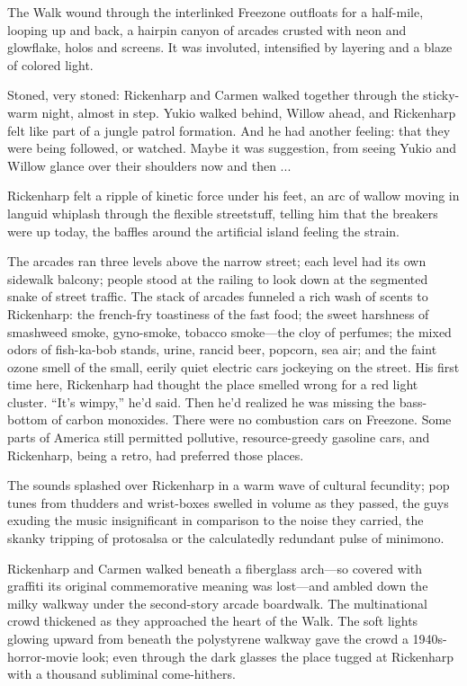 The Walk wound through the interlinked Freezone outfloats for a half-mile, looping up and back, a hairpin canyon of arcades crusted with neon and glowflake, holos and screens. It was involuted, intensified by layering and a blaze of colored light.

Stoned, very stoned: Rickenharp and Carmen walked together through the sticky-warm night, almost in step. Yukio walked behind, Willow ahead, and Rickenharp felt like part of a jungle patrol formation. And he had another feeling: that they were being followed, or watched. Maybe it was suggestion, from seeing Yukio and Willow glance over their shoulders now and then ...

Rickenharp felt a ripple of kinetic force under his feet, an arc of wallow moving in languid whiplash through the flexible streetstuff, telling him that the breakers were up today, the baffles around the artificial island feeling the strain.

The arcades ran three levels above the narrow street; each level had its own sidewalk balcony; people stood at the railing to look down at the segmented snake of street traffic. The stack of arcades funneled a rich wash of scents to Rickenharp: the french-fry toastiness of the fast food; the sweet harshness of smashweed smoke, gyno-smoke, tobacco smoke—the cloy of perfumes; the mixed odors of fish-ka-bob stands, urine, rancid beer, popcorn, sea air; and the faint ozone smell of the small, eerily quiet electric cars jockeying on the street. His first time here, Rickenharp had thought the place smelled wrong for a red light cluster. ``It's wimpy,'' he'd said. Then he'd realized he was missing the bass-bottom of carbon monoxides. There were no combustion cars on Freezone. Some parts of America still permitted pollutive, resource-greedy gasoline cars, and Rickenharp, being a retro, had preferred those places.

The sounds splashed over Rickenharp in a warm wave of cultural fecundity; pop tunes from thudders and wrist-boxes swelled in volume as they passed, the guys exuding the music insignificant in comparison to the noise they carried, the skanky tripping of protosalsa or the calculatedly redundant pulse of minimono.

Rickenharp and Carmen walked beneath a fiberglass arch—so covered with graffiti its original commemorative meaning was lost—and ambled down the milky walkway under the second-story arcade boardwalk. The multinational crowd thickened as they approached the heart of the Walk. The soft lights glowing upward from beneath the polystyrene walkway gave the crowd a 1940s-horror-movie look; even through the dark glasses the place tugged at Rickenharp with a thousand subliminal come-hithers.

